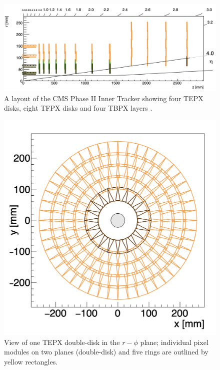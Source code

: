 \begin{figure}[H]
  \centering
  \includegraphics[width=1 \columnwidth]{ashish_thesis/it_newgeometry_.png}
  \caption[Phase II CMS Inner Tracker]{ \onehalfspacing A layout of the CMS Phase II Inner Tracker showing four TEPX disks, eight TFPX disks and four TBPX layers \cite{Collaboration:275907420}.}
  \label{fig:Innertracker}
\end{figure}

\begin{figure}[H]
  \centering
  \includegraphics[width=0.5 \columnwidth]{ashish_thesis/tepx_DD.png}
  \caption[X-Y view of TEPX double-disk]{ \onehalfspacing View of one TEPX double-disk in the $r-\phi$ plane; individual pixel modules on two planes (double-disk) and five rings are outlined by yellow rectangles. %
  }
  \label{fig:Innertracker_40}
\end{figure}


